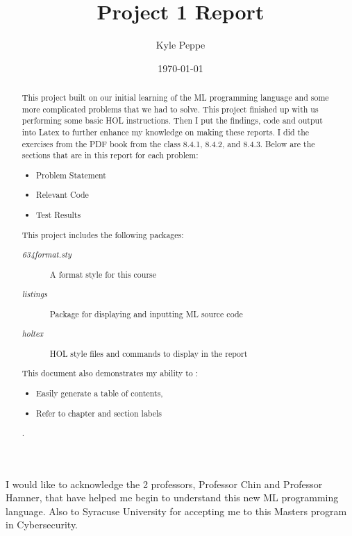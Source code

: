 \documentclass{report}
\title{Project 1 Report}
\author{Kyle Peppe}
\date{\today}
\begin{document}
\lstset{language=ML}


\maketitle{}

\begin{abstract}
  This project built on our initial learning of the ML programming
  language and some more complicated problems that we had to
  solve. This project finished up with us performing some basic HOL
  instructions. Then I put the findings, code and output into Latex to
  further enhance my knowledge on making these reports. I did the
  exercises from the PDF book from the class 8.4.1, 8.4.2, and
  8.4.3. Below are the sections that are in this report for each
  problem:
	\begin{itemize}
		\item Problem Statement
		\item Relevant Code
		\item Test Results
	\end{itemize}
        This project includes the following packages:
	\begin{description}
		\item[\emph{634format.sty}] A format style for this course
		\item[\emph{listings}] Package for displaying and inputting ML source code
		\item[\emph{holtex}] HOL style files and commands to display in the report
	\end{description}
        This document also demonstrates my ability to :
	\begin{itemize}
		\item Easily generate a table of contents,
		\item Refer to chapter and section labels
	\end{itemize}.
\end{abstract}

\tableofcontents{}

\begin{acknowledgments}
  I would like to acknowledge the 2 professors, Professor Chin and 
  Professor Hamner, that have helped me begin to understand this new
  ML programming language. Also to Syracuse University for accepting
  me to this Masters program in Cybersecurity.
\end{acknowledgments}
\end{document}
